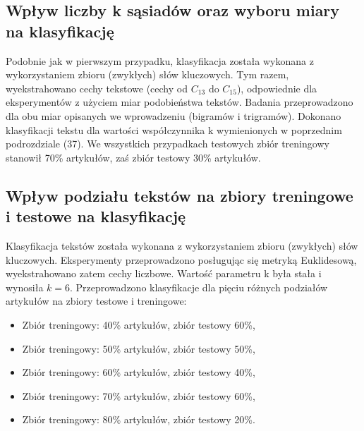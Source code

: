 \documentclass{classrep}
\begin{document}
\subsection{Wpływ liczby k sąsiadów oraz wyboru miary na klasyfikację}
Podobnie jak w pierwszym przypadku, klasyfikacja została wykonana z wykorzystaniem zbioru (zwykłych) słów kluczowych. Tym razem, wyekstrahowano cechy tekstowe (cechy od $C_{13}$ do $C_{15}$), odpowiednie dla eksperymentów z użyciem miar podobieństwa tekstów. Badania przeprowadzono dla obu miar opisanych we wprowadzeniu (bigramów i trigramów). Dokonano klasyfikacji tekstu dla wartości współczynnika k wymienionych w poprzednim podrozdziale (37). We wszystkich przypadkach testowych zbiór treningowy stanowił 70\% artykułów, zaś zbiór testowy 30\% artykułów.

\subsection{Wpływ podziału tekstów na zbiory treningowe i testowe na klasyfikację}
Klasyfikacja tekstów została wykonana z wykorzystaniem zbioru (zwykłych) słów kluczowych. Eksperymenty przeprowadzono posługując się metryką Euklidesową, wyekstrahowano zatem cechy liczbowe. Wartość parametru k była stała i wynosiła $k=6$. Przeprowadzono klasyfikacje dla pięciu różnych podziałów artykułów na zbiory testowe i treningowe: 
\begin{itemize}[label=$\bullet$\scshape\bfseries]

\item Zbiór treningowy: 40\% artykułów, zbiór testowy 60\%,
\item Zbiór treningowy: 50\% artykułów, zbiór testowy 50\%,
\item Zbiór treningowy: 60\% artykułów, zbiór testowy 40\%,
\item Zbiór treningowy: 70\% artykułów, zbiór testowy 60\%,
\item Zbiór treningowy: 80\% artykułów, zbiór testowy 20\%.

\end{itemize}
\end{document}
